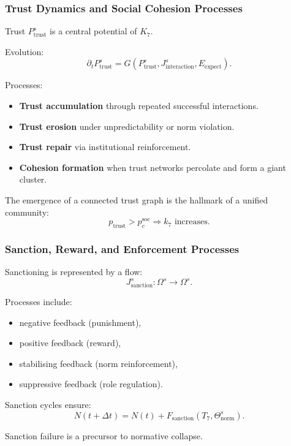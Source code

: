 \subsubsection{Trust Dynamics and Social Cohesion Processes}

Trust $P^s_{\text{trust}}$ is a central potential of $K_7$.

Evolution:
\[
\partial_t P^s_{\text{trust}} =
G(P^s_{\text{trust}}, J^s_{\text{interaction}}, E_{\text{expect}}).
\]

Processes:
\begin{itemize}
    \item \textbf{Trust accumulation} through repeated successful interactions.
    \item \textbf{Trust erosion} under unpredictability or norm violation.
    \item \textbf{Trust repair} via institutional reinforcement.
    \item \textbf{Cohesion formation} when trust networks percolate and form a giant cluster.
\end{itemize}

The emergence of a connected trust graph is the hallmark of a unified community:
\[
p_{\text{trust}} > p_c^{\text{soc}} \Rightarrow k_7 \text{ increases}.
\]

\subsubsection{Sanction, Reward, and Enforcement Processes}

Sanctioning is represented by a flow:
\[
J^s_{\text{sanction}}:\Omega^s\to\Omega^s.
\]

Processes include:
\begin{itemize}
    \item negative feedback (punishment),
    \item positive feedback (reward),
    \item stabilising feedback (norm reinforcement),
    \item suppressive feedback (role regulation).
\end{itemize}

Sanction cycles ensure:
\[
N(t+\Delta t) = N(t) + F_{\text{sanction}}(T_7, \Theta^s_{\text{norm}}).
\]

Sanction failure is a precursor to normative collapse.

